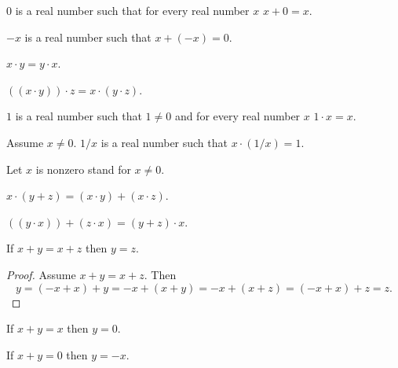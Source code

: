 \documentclass{article}
\begin{document}
\begin{forthel}
\begin{signature}[1 12 A4]
$0$ is a real number such that
for every real number $x$ $x + 0 = x$.
\end{signature}

\begin{signature}[1 12 A5]
$-x$ is a real number such that $x + (-x) = 0$.
\end{signature}

\begin{axiom}[1 12 M2]
$x \cdot y = y \cdot x$.
\end{axiom}

\begin{axiom}[1 12 M3]
$((x \cdot y)) \cdot z = x \cdot (y \cdot z)$.
\end{axiom}

\begin{signature}[1 12 M4]
$1$ is a real number such that $1 \neq 0$ and
for every real number $x$ $1 \cdot x = x$.
\end{signature}

\begin{signature}[1 12 M5]
Assume $x \neq 0$. $1/x$ is a real number
such that $x \cdot (1/x) = 1$.
\end{signature}

Let $x$ is nonzero stand for $x \neq 0$.

\begin{axiom}[1 12 D]
$x \cdot (y + z) = (x \cdot y) + (x \cdot z)$.
\end{axiom}

\begin{proposition}[Dist1]
$((y \cdot x)) + (z \cdot x) = (y + z) \cdot x$.
\end{proposition}

\begin{proposition}[1 14 a]
If $x + y = x + z$ then $y = z$.
\end{proposition}
\begin{proof}
Assume $x + y = x + z$.
Then \[ y = (-x+x) + y = -x + (x+y) = -x + (x+z) = (-x+x) + z = z. \]
\end{proof}

\begin{proposition}[1 14 b]
If $x + y = x$ then $y = 0$.
\end{proposition}

\begin{proposition}[1 14 c]
If $x + y = 0$ then $y = -x$.
\end{proposition}


\end{forthel}
\end{document}

